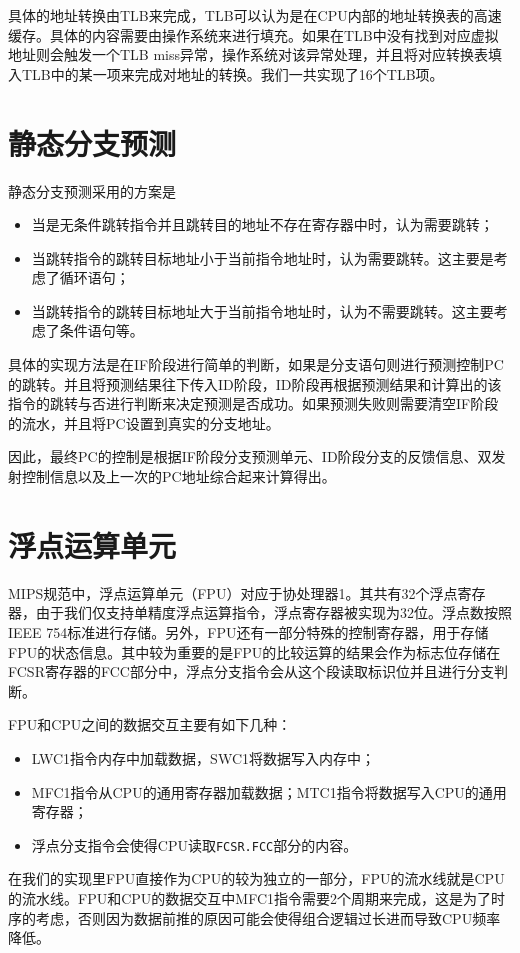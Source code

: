 具体的地址转换由TLB来完成，TLB可以认为是在CPU内部的地址转换表的高速缓存。具体的内容需要由操作系统来进行填充。如果在TLB中没有找到对应虚拟地址则会触发一个TLB miss异常，操作系统对该异常处理，并且将对应转换表填入TLB中的某一项来完成对地址的转换。我们一共实现了16个TLB项。

\section{静态分支预测}
静态分支预测采用的方案是
\begin{itemize}
	\item 当是无条件跳转指令并且跳转目的地址不存在寄存器中时，认为需要跳转；
	\item 当跳转指令的跳转目标地址小于当前指令地址时，认为需要跳转。这主要是考虑了循环语句；
	\item 当跳转指令的跳转目标地址大于当前指令地址时，认为不需要跳转。这主要考虑了条件语句等。
\end{itemize}

具体的实现方法是在IF阶段进行简单的判断，如果是分支语句则进行预测控制PC的跳转。并且将预测结果往下传入ID阶段，ID阶段再根据预测结果和计算出的该指令的跳转与否进行判断来决定预测是否成功。如果预测失败则需要清空IF阶段的流水，并且将PC设置到真实的分支地址。

因此，最终PC的控制是根据IF阶段分支预测单元、ID阶段分支的反馈信息、双发射控制信息以及上一次的PC地址综合起来计算得出。

\section{浮点运算单元}
MIPS规范中，浮点运算单元（FPU）对应于协处理器1。其共有32个浮点寄存器，由于我们仅支持单精度浮点运算指令，浮点寄存器被实现为32位。浮点数按照IEEE 754标准进行存储。另外，FPU还有一部分特殊的控制寄存器，用于存储FPU的状态信息。其中较为重要的是FPU的比较运算的结果会作为标志位存储在FCSR寄存器的FCC部分中，浮点分支指令会从这个段读取标识位并且进行分支判断。

FPU和CPU之间的数据交互主要有如下几种：
\begin{itemize}
	\item LWC1指令内存中加载数据，SWC1将数据写入内存中；
	\item MFC1指令从CPU的通用寄存器加载数据；MTC1指令将数据写入CPU的通用寄存器；
	\item 浮点分支指令会使得CPU读取\texttt{FCSR.FCC}部分的内容。
\end{itemize}

在我们的实现里FPU直接作为CPU的较为独立的一部分，FPU的流水线就是CPU的流水线。FPU和CPU的数据交互中MFC1指令需要2个周期来完成，这是为了时序的考虑，否则因为数据前推的原因可能会使得组合逻辑过长进而导致CPU频率降低。


